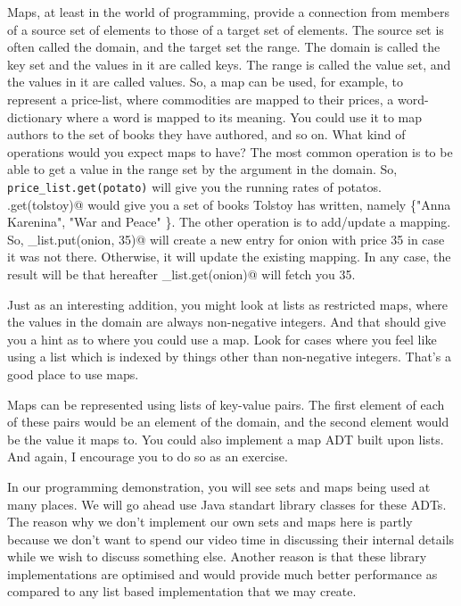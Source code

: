 \documentclass[12pt,a4paper]{article}
\begin{document}
Maps, at least in the world of programming, provide a connection from members of a source set of elements to those of a target set of elements. The source set is often called the domain, and the target set the range. The domain is called the key set and the values in it are called keys. The range is called the value set, and the values in it are called values. So, a map can be used, for example, to represent a price-list, where commodities are mapped to their prices, a word-dictionary where a word is mapped to its meaning. You could use it to map authors to the set of books they have authored, and so on. What kind of operations would you expect maps to have? The most common operation is to be able to get a value in the range set by the argument in the domain. So, \lstinline|price_list.get(potato)| will give you the running rates of potatos. \lstinline@authors.get(tolstoy)@ would give you a set of books Tolstoy has written, namely \{"Anna Karenina", "War and Peace" \}. The other operation is to add/update a mapping. So, \lstinline@price_list.put(onion, 35)@ will create a new entry for onion with price 35 in case it was not there. Otherwise, it will update the existing mapping. In any case, the result will be that hereafter \lstinline@price_list.get(onion)@ will fetch you 35.

Just as an interesting addition, you might look at lists as restricted maps, where the values in the domain are always non-negative integers. And that should give you a hint as to where you could use a map. Look for cases where you feel like using a list which is indexed by things other than non-negative integers. That's a good place to use maps.

Maps can be represented using lists of key-value pairs. The first element of each of these pairs would be an element of the domain, and the second element would be the value it maps to. You could also implement a map ADT built upon lists. And again, I encourage you to do so as an exercise.

In our programming demonstration, you will see sets and maps being used at many places. We will go ahead use Java standart library classes for these ADTs. The reason why we don't implement our own sets and maps here is partly because we don't want to spend our video time in discussing their internal details while we wish to discuss something else. Another reason is that these library implementations are optimised and would provide much better performance as compared to any list based implementation that we may create.
\end{document}
